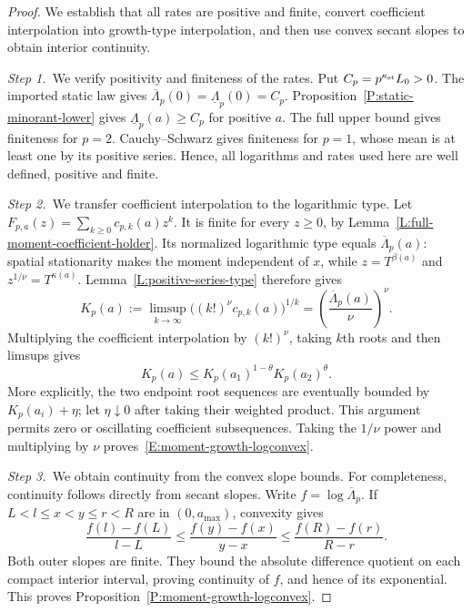 \documentclass[12pt,oneside,openany]{book}
\numberwithin{equation}{section}
\theoremstyle{nogostyle}
\theoremstyle{definition}
\begin{document}
\begin{proof}
  We establish that all rates are positive and finite, convert coefficient
  interpolation into growth-type interpolation, and then use convex secant
  slopes to obtain interior continuity.


  \medskip
  \noindent\textit{Step 1.~}We verify positivity and finiteness of the rates.
  Put \(C_p=p^{\kappa_{\rm st}}L_0>0\). The imported static law gives
  \(\overline{\Lambda}_p(0)=\underline{\Lambda}_p(0)=C_p\).
  Proposition~\ref{P:static-minorant-lower} gives \(\underline{\Lambda}_p(a)\ge
  C_p\) for positive \(a\). The full upper bound gives finiteness for \(p=2\).
  Cauchy--Schwarz gives finiteness for \(p=1\), whose mean is at least one by
  its positive series. Hence, all logarithms and rates used here are well
  defined, positive and finite.


  \medskip
  \noindent\textit{Step 2.~}We transfer coefficient interpolation to the
  logarithmic type.
  Let \(F_{p,a}(z)=\sum_{k\ge0}c_{p,k}(a)z^k\). It is finite for every
  \(z\ge0\), by Lemma~\ref{L:full-moment-coefficient-holder}. Its normalized
  logarithmic type equals \(\overline{\Lambda}_p(a)\): spatial stationarity
  makes the moment independent of \(x\), while \(z=T^{\beta(a)}\) and
  \(z^{1/\nu}=T^{\kappa(a)}\). Lemma~\ref{L:positive-series-type} therefore
  gives
  \[
    K_p(a):=\limsup_{k\to\infty}
    \big((k!)^\nu c_{p,k}(a)\big)^{1/k}
    =\left(\frac{\overline{\Lambda}_p(a)}{\nu}\right)^\nu.
  \]
  Multiplying the coefficient interpolation by \((k!)^\nu\), taking \(k\)th
  roots and then limsups gives
  \[
    K_p(a)\le K_p(a_1)^{1-\theta}K_p(a_2)^\theta.
  \]
  More explicitly, the two endpoint root sequences are eventually bounded by
  \(K_p(a_i)+\eta\); let \(\eta\downarrow0\) after taking their weighted
  product. This argument permits zero or oscillating coefficient subsequences.
  Taking the \(1/\nu\) power and multiplying by \(\nu\)
  proves~\eqref{E:moment-growth-logconvex}.


  \medskip
  \noindent\textit{Step 3.~}We obtain continuity from the convex slope bounds.
  For completeness, continuity follows directly from secant slopes. Write
  \(f=\log\overline{\Lambda}_p\). If \(L<l\le x<y\le r<R\) are in
  \((0,a_{\max})\), convexity gives
  \[
    \frac{f(l)-f(L)}{l-L}\le
    \frac{f(y)-f(x)}{y-x}\le
    \frac{f(R)-f(r)}{R-r}.
  \]
  Both outer slopes are finite. They bound the absolute difference quotient on
  each compact interior interval, proving continuity of \(f\), and hence of its
  exponential. This proves Proposition~\ref{P:moment-growth-logconvex}.
\end{proof}
\end{document}

